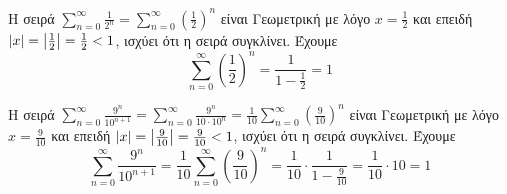 \begin{examples}
\item Η σειρά $ \sum_{n=0}^{\infty} \frac{1}{2^{n}} = \sum_{n=0}^{\infty} 
    {\left(\frac{1}{2} \right)}^{n} $ είναι Γεωμετρική με λόγο $ x = \frac{1}{2} $ 
    και επειδή 
    $ \abs{x} = \abs{\frac{1}{2}} = \frac{1}{2} < 1  $, ισχύει ότι η σειρά συγκλίνει.
    Έχουμε
    \[
        \sum_{n=0}^{\infty} {\left(\frac{1}{2} \right)}^{n} = 
        \frac{1}{1 - \frac{1}{2}} = 1
    \] 

\item Η σειρά $ \sum_{n=0}^{\infty} \frac{9^{n}}{10^{n+1}} = 
    \sum_{n=0}^{\infty} \frac{9^{n}}{10 \cdot 10^{n}} = 
    \frac{1}{10} \sum_{n=0}^{\infty} {\left(\frac{9}{10} \right)}^{n} $ είναι
    Γεωμετρική με λόγο $ x = \frac{9}{10} $ και επειδή $ \abs{x} = 
    \abs{\frac{9}{10}} = \frac{9}{10} < 1$, ισχύει ότι η σειρά συγκλίνει.
    Έχουμε 
    \[
        \sum_{n=0}^{\infty}  \frac{9^{n}}{10^{n+1}} = 
        \frac{1}{10} \sum_{n=0}^{\infty} {\left(\frac{9}{10} \right)}^{n} = 
        \frac{1}{10} \cdot \frac{1}{1 - \frac{9}{10}} = \frac{1}{10} \cdot 10 = 1
    \]
\end{examples}


